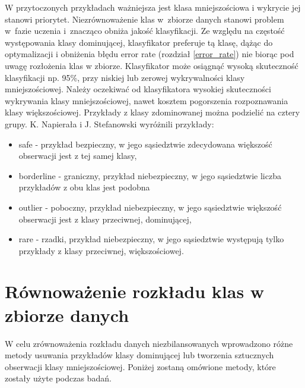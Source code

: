 W przytoczonych przykładach ważniejsza jest klasa mniejszościowa i wykrycie jej stanowi priorytet. Niezrównoważenie klas w zbiorze danych stanowi problem w fazie uczenia i znacząco obniża jakość klasyfikacji. Ze względu na częstość występowania klasy dominującej, klasyfikator preferuje tą klasę, dążąc do optymalizacji i obniżenia błędu error rate (rozdział \ref{error_rate}) nie biorąc pod uwagę rozłożenia klas w zbiorze. Klasyfikator może osiągnąć wysoką skuteczność klasyfikacji np. 95\%, przy niskiej lub zerowej wykrywalności klasy mniejszościowej. 
Należy oczekiwać od klasyfikatora wysokiej skuteczności wykrywania klasy mniejszościowej, nawet kosztem pogorszenia rozpoznawania klasy większościowej.
Przykłady z klasy zdominowanej można podzielić na cztery grupy. K. Napierała i J. Stefanowski wyróżnili przykłady\cite{przykladyklas}:
\begin{itemize}
	\item safe - przykład bezpieczny, w jego sąsiedztwie zdecydowana większość obserwacji jest z tej samej klasy,
	\item borderline - graniczny, przykład niebezpieczny, w jego sąsiedztwie liczba przykładów z obu klas jest podobna
	\item outlier - poboczny, przykład niebezpieczny, w jego sąsiedztwie większość obserwacji jest z klasy przeciwnej, dominującej,
	\item rare - rzadki, przykład niebezpieczny, w jego sąsiedztwie występują tylko przykłady z klasy przeciwnej, większościowej.
\end{itemize}

\section{Równoważenie rozkładu klas w zbiorze danych}
\label{rozdzialopissamplingu}
W celu zrównoważenia rozkładu danych niezbilansowanych wprowadzono różne metody usuwania przykładów klasy dominującej lub tworzenia sztucznych obserwacji klasy mniejszościowej. Poniżej zostaną omówione metody, które zostały użyte podczas badań.
